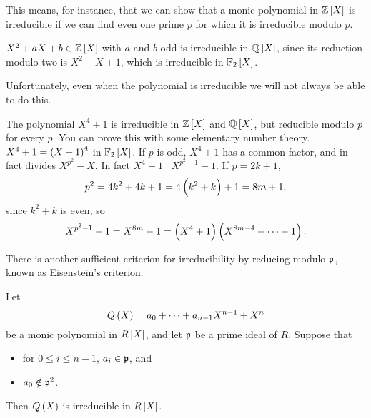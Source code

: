 This means, for instance, that we can show that a monic polynomial in $ \Z\sbr{X} $ is irreducible if we can find even one prime $ p $ for which it is irreducible modulo $ p $.

\begin{example*}
$ X^2 + aX + b \in \Z\sbr{X} $ with $ a $ and $ b $ odd is irreducible in $ \Q\sbr{X} $, since its reduction modulo two is $ X^2 + X + 1 $, which is irreducible in $ \F_2\sbr{X} $.
\end{example*}

Unfortunately, even when the polynomial is irreducible we will not always be able to do this.

\begin{example*}
The polynomial $ X^4 + 1 $ is irreducible in $ \Z\sbr{X} $ and $ \Q\sbr{X} $, but reducible modulo $ p $ for every $ p $. You can prove this with some elementary number theory. $ X^4 + 1 = \br{X + 1}^4 $ in $ \F_2\sbr{X} $. If $ p $ is odd, $ X^4 + 1 $ has a common factor, and in fact divides $ X^{p^2} - X $. In fact $ X^4 + 1 \mid X^{p^2 - 1} - 1 $. If $ p = 2k + 1 $,
$$ p^2 = 4k^2 + 4k + 1 = 4\br{k^2 + k} + 1 = 8m + 1, $$
since $ k^2 + k $ is even, so
$$ X^{p^2 - 1} - 1 = X^{8m} - 1 = \br{X^4 + 1}\br{X^{8m - 4} - \dots - 1}. $$
\end{example*}

There is another sufficient criterion for irreducibility by reducing modulo $ \mathfrak{p} $, known as Eisenstein's criterion.

\begin{proposition}
Let
$$ Q\br{X} = a_0 + \dots + a_{n - 1}X^{n - 1} + X^n $$
be a monic polynomial in $ R\sbr{X} $, and let $ \mathfrak{p} $ be a prime ideal of $ R $. Suppose that
\begin{itemize}
\item for $ 0 \le i \le n - 1 $, $ a_i \in \mathfrak{p} $, and
\item $ a_0 \notin \mathfrak{p}^2 $.
\end{itemize}
Then $ Q\br{X} $ is irreducible in $ R\sbr{X} $.
\end{proposition}

